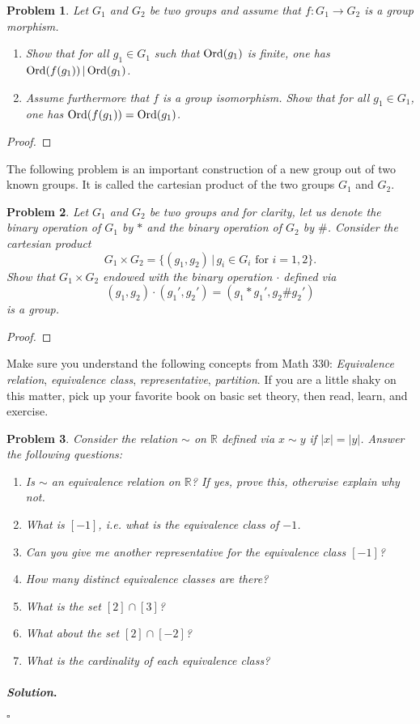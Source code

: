 \documentclass[reqno]{amsart}
\theoremstyle{plain}
\newtheorem{problem}{Problem}
\theoremstyle{definition}
\newenvironment{solution}{\paragraph{\emph{Solution}.}}{\hfill$\square$}
\begin{document}
\begin{problem}
Let $G_{1}$ and $G_{2}$ be two groups and assume that $f:G_{1} \longrightarrow G_{2}$ is a group morphism.
\begin{enumerate}
\item Show that for all $g_{1} \in G_{1}$ such that ${\rm Ord}(g_{1})$ is finite, one has ${\rm Ord}(f(g_{1})) \, | \, {\rm Ord}(g_{1})$.
\item Assume furthermore that $f$ is a group isomorphism.  Show that for all $g_{1} \in G_{1}$, one has ${\rm Ord}(f(g_{1})) = {\rm Ord}(g_{1})$.
\end{enumerate}  
\end{problem}
\begin{proof}

\end{proof}

The following problem is an important construction of a new group out of two known groups.  It is called the cartesian product of the two groups $G_{1}$ and $G_{2}$.
\begin{problem}
Let $G_{1}$ and $G_{2}$ be two groups and for clarity, let us denote the binary operation of $G_{1}$ by $*$ and the binary operation of $G_{2}$ by $\#$.  Consider the cartesian product
$$G_{1} \times G_{2} = \{(g_{1},g_{2}) \, | \, g_{i} \in G_{i} \text{ for } i=1,2  \}. $$
Show that $G_{1} \times G_{2}$ endowed with the binary operation $\cdot$ defined via
$$(g_{1},g_{2}) \cdot (g_{1}',g_{2}') = (g_{1} * g_{1}', g_{2} \# g_{2}') $$
is a group.
\end{problem}
\begin{proof}

\end{proof}

Make sure you understand the following concepts from Math 330:  \emph{Equivalence relation}, \emph{equivalence class}, \emph{representative}, \emph{partition}.  If you are a little shaky on this matter, pick up your favorite book on basic set theory, then read, learn, and exercise.

\begin{problem}
Consider the relation $\sim$ on $\mathbb{R}$ defined via $x \sim y$ if $|x| = |y|$.  Answer the following questions:
\begin{enumerate}
\item Is $\sim$ an equivalence relation on $\mathbb{R}$?  If yes, prove this, otherwise explain why not.
\item What is $[-1]$, i.e. what is the equivalence class of $-1$.
\item Can you give me another representative for the equivalence class $[-1]$?
\item How many distinct equivalence classes are there?
\item What is the set $[2] \cap [3]$?
\item What about the set $[2] \cap [-2]$?
\item What is the cardinality of each equivalence class?
\end{enumerate}
\end{problem}
\begin{solution}

\end{solution}
\end{document}
